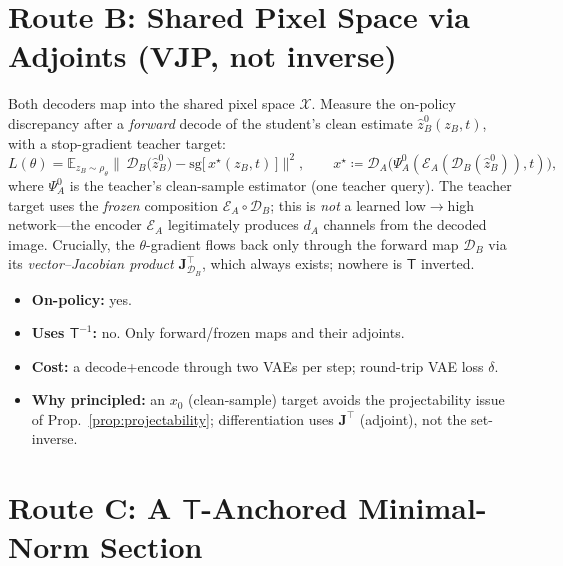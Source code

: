 \documentclass[11pt,a4paper]{article}
\newcommand{\E}{\mathbb{E}}
\newcommand{\sg}{\mathrm{sg}}
\newcommand{\Xspace}{\mathcal{X}}
\newcommand{\Enc}{\mathcal{E}}
\newcommand{\Dec}{\mathcal{D}}
\newcommand{\Tmap}{\mathsf{T}}
\newcommand{\Tinv}{\mathsf{T}^{-1}}
\newcommand{\Jac}{\mathbf{J}}
\theoremstyle{definition}
\begin{document}
\section{Route B: Shared Pixel Space via Adjoints (VJP, not inverse)}
\label{sec:routeB}

Both decoders map into the shared pixel space $\Xspace$. Measure the on-policy discrepancy after
a \emph{forward} decode of the student's clean estimate
$\hat z_B^{0}(z_B,t)$, with a stop-gradient teacher target:
\begin{equation}
L(\theta)=\E_{z_B\sim\rho_\theta}\Big\|\,\Dec_B\big(\hat z_B^{0}\big)
-\sg\!\big[\,x^\star(z_B,t)\,\big]\Big\|^2,
\qquad
x^\star \coloneqq \Dec_A\big(\Psi_A^{0}(\Enc_A(\Dec_B(\hat z_B^{0})),t)\big),
\label{eq:pixel}
\end{equation}
where $\Psi_A^{0}$ is the teacher's clean-sample estimator (one teacher query). The teacher
target uses the \emph{frozen} composition $\Enc_A\circ\Dec_B$; this is \emph{not} a learned
low$\to$high network---the encoder $\Enc_A$ legitimately produces $d_A$ channels from the
decoded image. Crucially, the $\theta$-gradient flows back only through the forward map $\Dec_B$
via its \emph{vector--Jacobian product} $\Jac_{\Dec_B}^{\!\top}$, which always exists; nowhere is
$\Tmap$ inverted.
\begin{itemize}[leftmargin=1.4em,itemsep=2pt]
  \item \textbf{On-policy:} yes.
  \item \textbf{Uses $\Tinv$:} no. Only forward/frozen maps and their adjoints.
  \item \textbf{Cost:} a decode+encode through two VAEs per step; round-trip VAE loss $\delta$.
  \item \textbf{Why principled:} an $x_0$ (clean-sample) target avoids the projectability issue of
        Prop.~\ref{prop:projectability}; differentiation uses $\Jac^{\top}$ (adjoint), not the
        set-inverse.
\end{itemize}

\section[Route C: An anchored minimal-norm section]
{Route C: A $\Tmap$-Anchored Minimal-Norm Section}
\label{sec:routeC}
\end{document}
